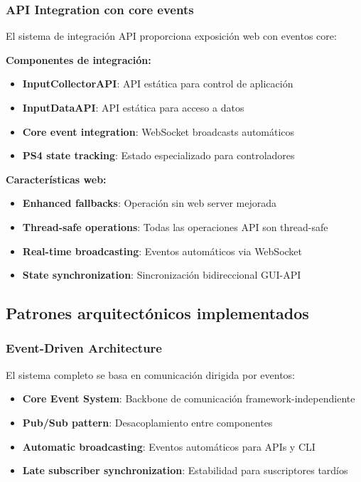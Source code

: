\subsubsection{API Integration con core events}

El sistema de integración API proporciona exposición web con eventos core:

\textbf{Componentes de integración:}
\begin{itemize}
    \item \textbf{InputCollectorAPI}: API estática para control de aplicación
    \item \textbf{InputDataAPI}: API estática para acceso a datos
    \item \textbf{Core event integration}: WebSocket broadcasts automáticos
    \item \textbf{PS4 state tracking}: Estado especializado para controladores
\end{itemize}

\textbf{Características web:}
\begin{itemize}
    \item \textbf{Enhanced fallbacks}: Operación sin web server mejorada
    \item \textbf{Thread-safe operations}: Todas las operaciones API son thread-safe
    \item \textbf{Real-time broadcasting}: Eventos automáticos via WebSocket
    \item \textbf{State synchronization}: Sincronización bidireccional GUI-API
\end{itemize}

\subsection{Patrones arquitectónicos implementados}
\label{subsec:patrones_input_collector}

\subsubsection{Event-Driven Architecture}
El sistema completo se basa en comunicación dirigida por eventos:
\begin{itemize}
    \item \textbf{Core Event System}: Backbone de comunicación framework-independiente
    \item \textbf{Pub/Sub pattern}: Desacoplamiento entre componentes
    \item \textbf{Automatic broadcasting}: Eventos automáticos para APIs y CLI
    \item \textbf{Late subscriber synchronization}: Estabilidad para suscriptores tardíos
\end{itemize}

